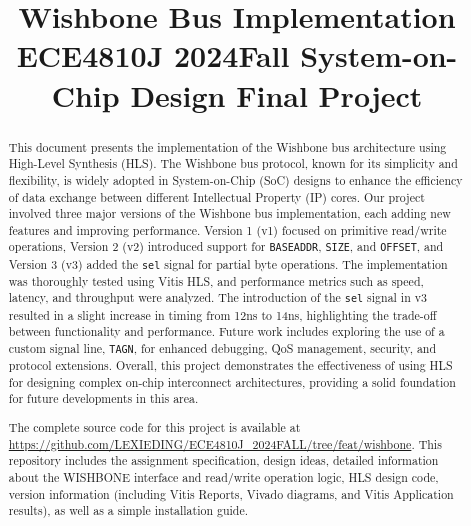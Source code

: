 \documentclass[conference]{IEEEtran}
\begin{document}
\title{Wishbone Bus Implementation\\
{\footnotesize \textsuperscript{}ECE4810J 2024Fall System-on-Chip Design Final Project}
}

\author{
\and
{}
\and
{}

}

\maketitle

\begin{abstract}
This document presents the implementation of the Wishbone bus architecture using High-Level Synthesis (HLS). The Wishbone bus protocol, known for its simplicity and flexibility, is widely adopted in System-on-Chip (SoC) designs to enhance the efficiency of data exchange between different Intellectual Property (IP) cores. Our project involved three major versions of the Wishbone bus implementation, each adding new features and improving performance. Version 1 (v1) focused on primitive read/write operations, Version 2 (v2) introduced support for \texttt{BASEADDR}, \texttt{SIZE}, and \texttt{OFFSET}, and Version 3 (v3) added the \texttt{sel} signal for partial byte operations. The implementation was thoroughly tested using Vitis HLS, and performance metrics such as speed, latency, and throughput were analyzed. The introduction of the \texttt{sel} signal in v3 resulted in a slight increase in timing from 12ns to 14ns, highlighting the trade-off between functionality and performance. Future work includes exploring the use of a custom signal line, \texttt{TAGN}, for enhanced debugging, QoS management, security, and protocol extensions. Overall, this project demonstrates the effectiveness of using HLS for designing complex on-chip interconnect architectures, providing a solid foundation for future developments in this area.

The complete source code for this project is available at \url{https://github.com/LEXIEDING/ECE4810J_2024FALL/tree/feat/wishbone}. This repository includes the assignment specification, design ideas, detailed information about the WISHBONE interface and read/write operation logic, HLS design code, version information (including Vitis Reports, Vivado diagrams, and Vitis Application results), as well as a simple installation guide.

\end{abstract}
\end{document}
